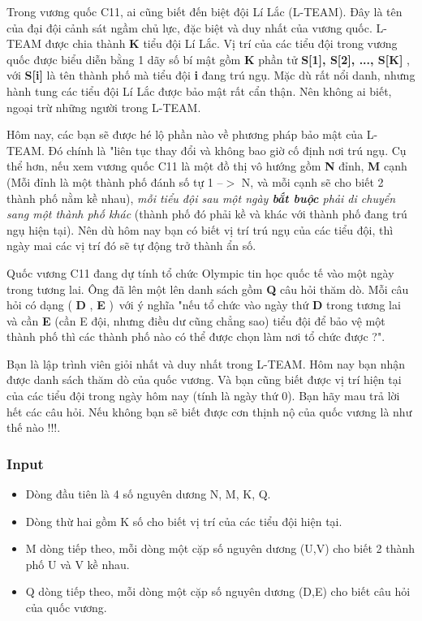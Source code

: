 



   Trong vương quốc C11, ai cũng biết đến biệt đội Lí Lắc (L-TEAM). Đây là tên của đại đội cảnh sát ngầm chủ lực, đặc biệt và duy nhất của vương quốc. L-TEAM được chia thành   \textbf{    K   }   tiểu đội Lí Lắc. Vị trí của các tiểu đội trong vương quốc được biểu diễn bằng 1 dãy số bí mật gồm   \textbf{    K   }   phần tử   \textbf{    S[1], S[2], ..., S[K]   }   , với   \textbf{    S[i]   }   là tên thành phố mà tiểu đội   \textbf{    i   }   đang trú ngụ. Mặc dù rất nổi danh, nhưng hành tung các tiểu đội Lí Lắc được bảo mật rất cẩn thận. Nên không ai biết, ngoại trừ những người trong L-TEAM.  

   Hôm nay, các bạn sẽ được hé lộ phần nào về phương pháp bảo mật của L-TEAM. Đó chính là "liên tục thay đổi và không bao giờ cố định nơi trú ngụ. Cụ thể hơn, nếu xem vương quốc C11 là một đồ thị vô hướng gồm   \textbf{    N   }   đỉnh,   \textbf{    M   }   cạnh (Mỗi đỉnh là một thành phố đánh số tự 1 --$>$ N, và mỗi cạnh sẽ cho biết 2 thành phố nằm kề nhau),   \emph{    mỗi tiểu đội sau một ngày    \textbf{     bắt buộc    }    phải di chuyển sang một thành phố khác   }   (thành phố đó phải kề và khác với thành phố đang trú ngụ hiện tại). Nên dù hôm nay bạn có biết vị trí trú ngụ của các tiểu đội, thì ngày mai các vị trí đó sẽ tự động trở thành ẩn số.  

   Quốc vương C11 đang dự tính tổ chức Olympic tin học quốc tế vào một ngày trong tương lai. Ông đã lên một lên danh sách gồm   \textbf{    Q   }   câu hỏi thăm dò. Mỗi câu hỏi có dạng   \textbf{}   (   \textbf{    D   }   ,   \textbf{    E   }   ) với ý nghĩa "nếu tổ chức vào ngày thứ   \textbf{    D   }   trong tương lai và cần   \textbf{    E   }   (cần E đội, nhưng điều dư cũng chẳng sao) tiểu đội để bảo vệ một thành phố thì các thành phố nào có thể được chọn làm nơi tổ chức được ?".  

   Bạn là lập trình viên giỏi nhất và duy nhất trong L-TEAM. Hôm nay bạn nhận được danh sách thăm dò của quốc vương. Và bạn cũng biết được vị trí hiện tại của các tiểu đội trong ngày hôm nay (tính là ngày thứ 0). Bạn hãy mau trả lời hết các câu hỏi. Nếu không bạn sẽ biết được cơn thịnh nộ của quốc vương là như thế nào !!!.  

\subsubsection{   Input  }
\begin{itemize}
	\item     Dòng đầu tiên là 4 số nguyên dương N, M, K, Q.   
	\item     Dòng thừ hai gồm K số cho biết vị trí của các tiểu đội hiện tại.   
	\item     M dòng tiếp theo, mỗi dòng một cặp số nguyên dương (U,V) cho biết 2 thành phố U và V kề nhau.   
	\item     Q dòng tiếp theo, mỗi dòng một cặp số nguyên dương (D,E) cho biết câu hỏi của quốc vương.   
\end{itemize}

